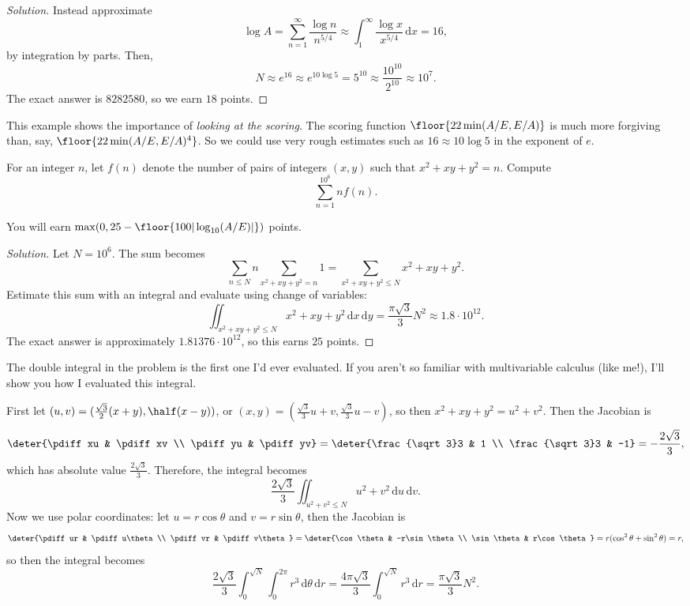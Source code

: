 \documentclass[11pt]{scrartcl}
\renewenvironment{solution}{\renewcommand\qedsymbol{$\blacksquare$}\begin{proof}[Solution]}{\end{proof}}
\begin{document}
\begin{solution}
	Instead approximate
	\[\log A = \sum_{n = 1}^{\infty}\frac{\log n}{n^{5/4}} \approx \int_1^\infty\frac{\log x}{x^{5/4}} \,\mathrm dx = 16,\]
	by integration by parts. Then,
	\[N \approx e^{16} \approx e^{10\log 5} = 5^{10} \approx \frac{10^{10}}{2^{10}} \approx 10^7.\]
	The exact answer is $8282580$, so we earn $18$ points.
\end{solution}

This example shows the importance of \emph{looking at the scoring}. The scoring function $\floor{22\min(A/E,E/A)}$ is much more forgiving than, say, $\floor{22\min(A/E,E/A)^4}$. So we could use very rough estimates such as $16 \approx 10\log 5$ in the exponent of $e$.

\begin{example}
	For an integer $n$, let $f(n)$ denote the number of pairs of integers $(x,y)$ such that $x^2 + xy + y^2 = n$. Compute
	\[\sum_{n = 1}^{10^6}nf(n).\]
	
	You will earn $\max(0,25 - \floor{100|\log_{10}(A/E)|})$ points.
\end{example}

\begin{solution}
	Let $N = 10^6$. The sum becomes
	\[\sum_{n \le N}n\sum_{x^2 + xy + y^2 = n}1 = \sum_{x^2 + xy + y^2 \le N}x^2 + xy + y^2.\]
	Estimate this sum with an integral and evaluate using change of variables:
	\[\iint_{x^2 + xy + y^2 \le N}x^2 + xy + y^2\,\mathrm dx\,\mathrm dy= \frac{\pi\sqrt 3}{3}N^2 \approx 1.8 \cdot 10^{12}.\]
	The exact answer is approximately $1.81376 \cdot 10^{12}$, so this earns $25$ points.
\end{solution}

\begin{remark*}
	The double integral in the problem is the first one I'd ever evaluated. If you aren't so familiar with multivariable calculus (like me!), I'll show you how I evaluated this integral.

	First let $(u,v) = (\frac{\sqrt 3}2(x + y),\half(x - y))$, or $(x,y) = (\frac{\sqrt 3}3u + v,\frac{\sqrt 3}3u - v)$, so then $x^2 + xy + y^2 = u^2 + v^2$. Then the Jacobian is
	\[\deter{\pdiff xu & \pdiff xv \\ \pdiff yu & \pdiff yv} = \deter{\frac{\sqrt 3}3 & 1 \\ \frac{\sqrt 3}3 & -1} = -\frac{2\sqrt 3}3,\]
	which has absolute value $\frac{2\sqrt 3}3$. Therefore, the integral becomes
	\[\frac{2\sqrt 3}3\iint_{u^2 + v^2 \le N}u^2 + v^2\,\mathrm du\,\mathrm dv.\]
	Now we use polar coordinates: let $u = r\cos\theta$ and $v = r\sin\theta$, then the Jacobian is
	\[\deter{\pdiff ur & \pdiff u\theta \\ \pdiff vr & \pdiff v\theta} = \deter{\cos\theta & -r\sin\theta \\ \sin\theta & r\cos\theta} = r(\cos^2\theta + \sin^2\theta) = r,\]
	so then the integral becomes
	\[\frac{2\sqrt 3}3\int_0^{\sqrt N}\int_0^{2\pi}r^3\,\mathrm d\theta\,\mathrm dr = \frac{4\pi\sqrt 3}3\int_0^{\sqrt N}r^3\,\mathrm dr = \frac{\pi\sqrt 3}{3}N^2.\]
\end{remark*}
\end{document}
